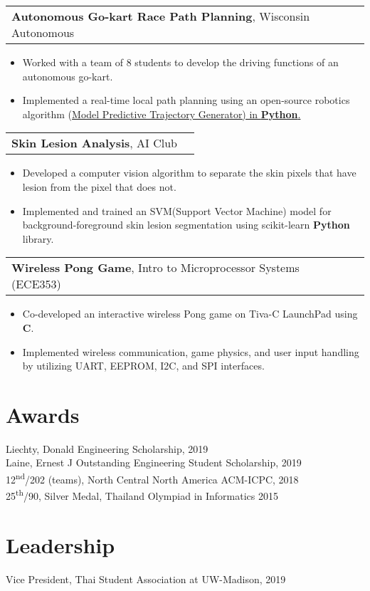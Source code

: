 \documentclass[letterpaper,11pt]{article}
\makeatletter
\newcommand{\resumeSubHeadingListStart}{\begin{itemize}[leftmargin=*,label={}]}
\newcommand{\resumeSubHeadingListEnd}{\end{itemize}}
\newcommand{\projtitle}[2]{
  \vspace{7pt}
  \begin{tabular*}{1.00\textwidth}[t]{l@{\extracolsep{\fill}}r}
    \textbf{#1}, #2 \\
  \end{tabular*}\vspace{-5pt}
}
\newcommand{\expstart}{\begin{itemize}[leftmargin=5mm]}
\newcommand{\expend}{\end{itemize}\vspace{-5pt}}
\newcommand{\expitem}[1]{\item\small{{#1 \vspace{-5pt}}}}
\makeatother
\begin{document}
  \projtitle{Autonomous Go-kart Race Path Planning}{Wisconsin Autonomous}
  \expstart
    \expitem{Worked with a team of 8 students to develop the driving functions of an autonomous go-kart.}
    \expitem{Implemented a real-time local path planning using an open-source robotics algorithm (\href{https://github.com/AtsushiSakai/PythonRobotics}{Model Predictive Trajectory Generator) in \textbf{Python}.}}
  \expend
  
  \projtitle{Skin Lesion Analysis}{AI Club}
  \expstart
    \expitem{Developed a computer vision algorithm to separate the skin pixels that have lesion from the pixel that does not.}
    \expitem{Implemented and trained an SVM(Support Vector Machine) model for background-foreground skin lesion segmentation using scikit-learn \textbf{Python} library.}
  \expend
  
  \projtitle{Wireless Pong Game}{Intro to Microprocessor Systems (ECE353)}
  \expstart
    \expitem{Co-developed an interactive wireless Pong game on Tiva-C LaunchPad using \textbf{C}. }
    \expitem{Implemented wireless communication, game physics, and user input handling by utilizing UART, EEPROM, I2C, and SPI interfaces.}
  \expend
  
\section{Awards}
  Liechty, Donald Engineering Scholarship, 2019\\
  Laine, Ernest J Outstanding Engineering Student Scholarship, 2019 \\
  12\textsuperscript{nd}/202 (teams), North Central North America ACM-ICPC, 2018 \\
  25\textsuperscript{th}/90, Silver Medal, Thailand Olympiad in Informatics 2015 \vspace{-2pt}
  
\section{Leadership}
   Vice President, Thai Student Association at UW-Madison, 2019
   

%


\end{document}
